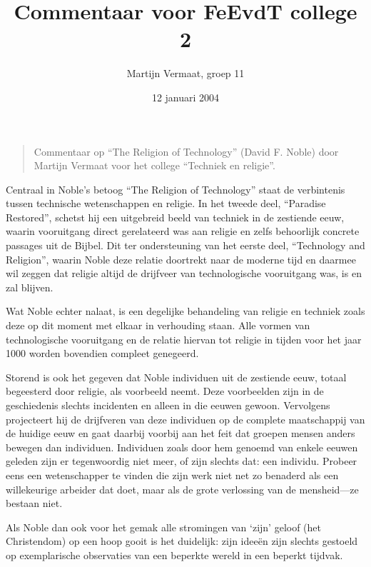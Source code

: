\documentclass[11pt]{article}
\title{Commentaar voor FeEvdT college 2}
\author{
    Martijn Vermaat, groep 11
}
\date{12 januari 2004}
\begin{document}
\maketitle

\begin{quote}
Commentaar op ``The Religion of Technology'' (David F. Noble) door Martijn Vermaat voor het college ``Techniek en religie''.
\end{quote}

Centraal in Noble's betoog ``The Religion of Technology'' staat de verbintenis
tussen technische wetenschappen en religie. In het tweede deel, ``Paradise
Restored'', schetst hij een uitgebreid beeld van techniek in de zestiende
eeuw, waarin vooruitgang direct gerelateerd was aan religie en zelfs
behoorlijk concrete passages uit de Bijbel. Dit ter ondersteuning van het
eerste deel, ``Technology and Religion'', waarin Noble deze relatie doortrekt
naar de moderne tijd en daarmee wil zeggen dat religie altijd de drijfveer van
technologische vooruitgang was, is en zal blijven.

Wat Noble echter nalaat, is een degelijke behandeling van religie en techniek
zoals deze op dit moment met elkaar in verhouding staan. Alle vormen van
technologische vooruitgang en de relatie hiervan tot religie in tijden voor
het jaar 1000 worden bovendien compleet genegeerd.

Storend is ook het gegeven dat Noble individuen uit de zestiende eeuw, totaal
begeesterd door religie, als voorbeeld neemt. Deze voorbeelden zijn in de
geschiedenis slechts incidenten en alleen in die eeuwen gewoon. Vervolgens
projecteert hij de drijfveren van deze individuen op de complete maatschappij
van de huidige eeuw en gaat daarbij voorbij aan het feit dat groepen mensen
anders bewegen dan individuen. Individuen zoals door hem genoemd van enkele
eeuwen geleden zijn er tegenwoordig niet meer, of zijn slechts dat: een
individu. Probeer eens een wetenschapper te vinden die zijn werk niet net zo
benaderd als een willekeurige arbeider dat doet, maar als de grote verlossing
van de mensheid---ze bestaan niet.

Als Noble dan ook voor het gemak alle stromingen van `zijn' geloof (het
Christendom) op een hoop gooit is het duidelijk: zijn idee\"en zijn slechts
gestoeld op exemplarische observaties van een beperkte wereld in een beperkt
tijdvak.
\end{document}
